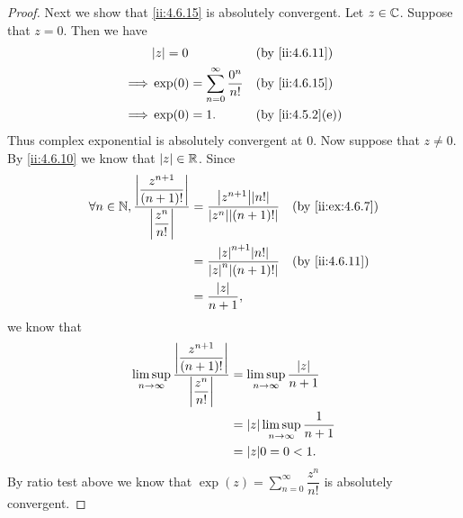 \begin{proof}
  Next we show that \cref{ii:4.6.15} is absolutely convergent.
  Let \(z \in \mathbb{C}\).
  Suppose that \(z = 0\).
  Then we have
  \begin{align*}
             & \abs{z} = 0                                   &  & \by{ii:4.6.11}   \\
    \implies & \exp(0) = \sum_{n = 0}^\infty \dfrac{0^n}{n!} &  & \by{ii:4.6.15}   \\
    \implies & \exp(0) = 1.                                  &  & \by{ii:4.5.2}[e]
  \end{align*}
  Thus complex exponential is absolutely convergent at \(0\).
  Now suppose that \(z \neq 0\).
  By \cref{ii:4.6.10} we know that \(\left\lvert z\right\rvert \in \mathbb{R}\).
  Since
  \begin{align*}
    \forall n \in \N, \dfrac{\abs{\dfrac{z^{n + 1}}{(n + 1)!}}}{\abs{\dfrac{z^n}{n!}}} & = \dfrac{\abs{z^{n + 1}} \abs{n!}}{\abs{z^n} \abs{(n + 1)!}} &  & \by{ii:ex:4.6.7} \\
                                                                                       & = \dfrac{\abs{z}^{n + 1} \abs{n!}}{\abs{z}^n \abs{(n + 1)!}} &  & \by{ii:4.6.11}   \\
                                                                                       & = \dfrac{\abs{z}}{n + 1},
  \end{align*}
  we know that
  \begin{align*}
    \limsup_{n \to \infty} \dfrac{\abs{\dfrac{z^{n + 1}}{(n + 1)!}}}{\abs{\dfrac{z^n}{n!}}} & = \limsup_{n \to \infty} \dfrac{\abs{z}}{n + 1}   \\
                                                                                            & = \abs{z} \limsup_{n \to \infty} \dfrac{1}{n + 1} \\
                                                                                            & = \abs{z} 0 = 0 < 1.
  \end{align*}
  By ratio test above we know that \(\exp(z) = \sum_{n = 0}^\infty \dfrac{z^n}{n!}\) is absolutely convergent.


\end{proof}
